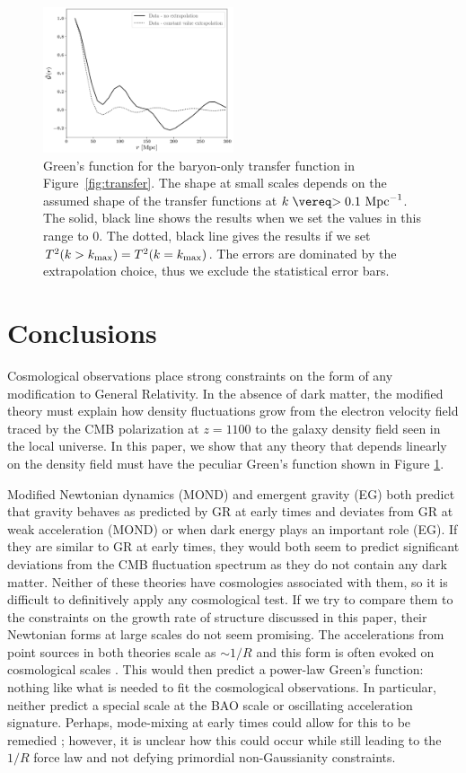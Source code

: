 \documentclass[12pt,floats,floatfix,showpacs,amssymb,amsmath,prl,superscriptaddress,nofootinbib, aps]{revtex4-2}
\begin{document}
\begin{figure}[!htb]
    \centering
    \includegraphics[width=0.5\textwidth]{greens.pdf}
    \caption{Green's function for the baryon-only transfer function in Figure~\ref{fig:transfer}. The shape at small scales depends on the assumed shape of the transfer functions at $k \gtrsim 0.1~\rm{Mpc}^{-1}$. The solid, black line shows the results when we set the values in this range to $0$. The dotted, black line gives the results if we set $T^2(k>k_{\rm{max}}) = T^2(k = k_{\rm{max}})$. The errors are dominated by the extrapolation choice, thus we exclude the statistical error bars.}
    \label{fig:greens}
\end{figure}

\section{Conclusions \label{sec:conclusions}}
Cosmological observations place strong constraints on the form of any modification to General Relativity. In the absence of dark matter, the modified theory must explain how density fluctuations grow from the electron velocity field traced by the CMB polarization at $z=1100$ to the galaxy density field seen in the local universe. In this paper, we show that any theory that depends linearly on the density field must have the peculiar Green's function shown in Figure \ref{fig:greens}.  

Modified Newtonian dynamics (MOND) \citep{Milgrom1983} and emergent gravity (EG) \citep{Verlinde2017} both predict that gravity behaves as predicted by GR at early times and deviates from GR at weak acceleration (MOND) or when dark energy plays an important role (EG).  If they are similar to GR at early times, they would both seem to predict significant deviations from the CMB fluctuation spectrum as they do not contain any dark matter. Neither of these theories have cosmologies associated with them, so it is difficult to definitively apply any cosmological test. If we try to compare them to the constraints on the growth rate of structure discussed in this paper, their Newtonian forms at large scales do not seem promising. The accelerations from point sources in both theories scale as $\sim 1/R$ and this form is often evoked on cosmological scales \citep{Nusser2002,Llinares2008}. This would then predict a power-law Green's function: nothing like what is needed to fit the cosmological observations. In particular, neither predict a special scale at the BAO scale or oscillating acceleration signature. Perhaps, mode-mixing at early times could allow for this to be remedied \citep{McGaugh2004}; however, it is unclear how this could occur while still leading to the $1/R$ force law and not defying primordial non-Gaussianity constraints.
\end{document}
